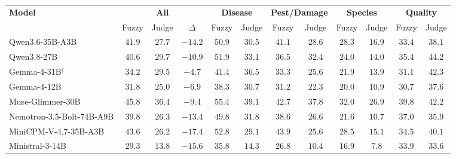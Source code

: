 \setlength{\tabcolsep}{4pt}
\begin{tabular}{lccccccccccc}
\toprule
\multirow{2}{*}{\textbf{Model}} & \multicolumn{3}{c}{\textbf{All}} & \multicolumn{2}{c}{\textbf{Disease}} & \multicolumn{2}{c}{\textbf{Pest/Damage}} & \multicolumn{2}{c}{\textbf{Species}} & \multicolumn{2}{c}{\textbf{Quality}} \\
\cmidrule(lr){2-4} \cmidrule(lr){5-6} \cmidrule(lr){7-8} \cmidrule(lr){9-10} \cmidrule(lr){11-12}
 & Fuzzy & Judge & $\Delta$ & Fuzzy & Judge & Fuzzy & Judge & Fuzzy & Judge & Fuzzy & Judge \\
\midrule
Qwen3.6-35B-A3B & $41.9$ & $27.7$ & $-14.2$ & $50.9$ & $30.5$ & $41.1$ & $28.6$ & $28.3$ & $16.9$ & $33.4$ & $38.1$ \\
Qwen3.8-27B & $40.6$ & $29.7$ & $-10.9$ & $51.9$ & $33.1$ & $36.5$ & $32.4$ & $24.0$ & $14.0$ & $35.4$ & $44.2$ \\
Gemma-4-31B$^\dagger$ & $34.2$ & $29.5$ & $-4.7$ & $41.4$ & $36.5$ & $33.3$ & $25.6$ & $21.9$ & $13.9$ & $31.1$ & $42.3$ \\
Gemma-4-12B & $31.8$ & $25.0$ & $-6.9$ & $38.3$ & $30.7$ & $31.2$ & $22.3$ & $20.0$ & $10.9$ & $30.7$ & $37.6$ \\
Muse-Glimmer-30B & $45.8$ & $36.4$ & $-9.4$ & $55.4$ & $39.1$ & $42.7$ & $37.8$ & $32.0$ & $26.9$ & $39.8$ & $42.2$ \\
Nemotron-3.5-Bolt-74B-A9B & $39.8$ & $26.3$ & $-13.4$ & $49.8$ & $31.8$ & $38.6$ & $26.6$ & $21.6$ & $10.7$ & $37.0$ & $35.9$ \\
MiniCPM-V-4.7-35B-A3B & $43.6$ & $26.2$ & $-17.4$ & $52.8$ & $29.1$ & $43.9$ & $25.6$ & $28.5$ & $15.1$ & $34.5$ & $40.1$ \\
Ministral-3-14B & $29.3$ & $13.8$ & $-15.6$ & $35.8$ & $14.3$ & $26.8$ & $10.4$ & $16.9$ & $7.8$ & $33.9$ & $33.6$ \\
\bottomrule
\end{tabular}
